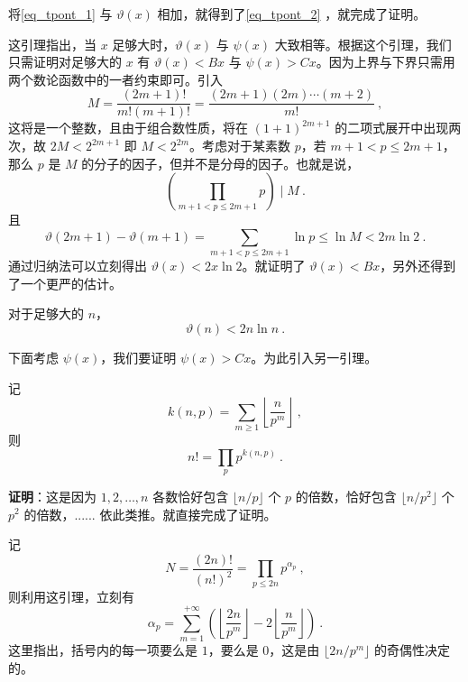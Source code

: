 将\autoref{eq_tpont_1} 与 $\vartheta(x)$ 相加，就得到了\autoref{eq_tpont_2} ，就完成了证明。


这引理指出，当 $x$ 足够大时，$\vartheta(x)$ 与 $\psi(x)$ 大致相等。根据这个引理，我们只需证明对足够大的 $x$ 有 $\vartheta(x) < Bx$ 与 $\psi(x) > Cx$。因为上界与下界只需用两个数论函数中的一者约束即可。引入
\begin{equation}
M = \frac{(2m+1)!}{m! (m+1)!} = \frac{(2m+1)(2m)\cdots(m+2)}{m!} ~,
\end{equation}
这将是一个整数，且由于组合数性质，将在 $(1+1)^{2m+1}$ 的二项式展开中出现两次，故 $2M < 2^{2m+1}$ 即 $M < 2^{2m}$。考虑对于某素数 $p$，若 $m+1 < p \le 2m+1$，那么 $p$ 是 $M$ 的分子的因子，但并不是分母的因子。也就是说，
\begin{equation}
\left( \prod_{m+1 < p \le 2m+1} p \right) \mid M ~.
\end{equation}
且
\begin{equation}
\vartheta(2m+1) - \vartheta(m+1) = \sum_{m+1 < p \le 2m+1} \ln p \le \ln M < 2 m \ln 2 ~.
\end{equation}
通过归纳法可以立刻得出 $\vartheta(x) < 2x \ln 2$。就证明了 $\vartheta(x) < Bx$，另外还得到了一个更严的估计。
\begin{corollary}{}\label{cor_tpont_1}
对于足够大的 $n$，
\begin{equation}
\vartheta(n) < 2 n \ln n ~.
\end{equation}

\end{corollary}

下面考虑 $\psi(x)$，我们要证明 $\psi(x) > Cx$。为此引入另一引理。
\begin{lemma}{}
记 
\begin{equation}
k(n, p) = \sum_{m\ge 1} \left\lfloor  \frac{n}{p^m} \right\rfloor ~,
\end{equation}
则
\begin{equation}
n! = \prod_p p^{k(n, p)} ~.
\end{equation}

\end{lemma}
\textbf{证明}：这是因为 $1, 2, \dots, n$ 各数恰好包含 $\lfloor n/p \rfloor$ 个 $p$ 的倍数，恰好包含 $ \lfloor n/p^2 \rfloor$ 个 $p^2$ 的倍数，...... 依此类推。就直接完成了证明。 

记 
\begin{equation}
N = \frac{(2n)!}{(n!)^2} = \prod_{p \le 2n} p^{\alpha_p} ~,
\end{equation}
则利用这引理，立刻有
\begin{equation}\label{eq_tpont_4}
\alpha_p = \sum_{m=1}^{+\infty} \left( \left\lfloor \frac{2n}{p^m} \right\rfloor - 2  \left\lfloor \frac{n}{p^m} \right\rfloor\right) ~.
\end{equation}
这里指出，括号内的每一项要么是 $1$，要么是 $0$，这是由 $\lfloor 2n/p^m \rfloor$ 的奇偶性决定的。

